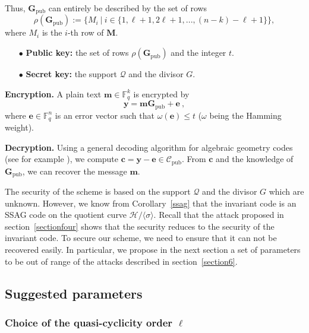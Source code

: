 \documentclass[10pt]{article}
\theoremstyle{definition}
\theoremstyle{definition}
\theoremstyle{definition}
\newcommand{\fq}{\mathbb{F}_q}
\newcommand{\w}{\omega}
\newcommand{\QR}{\mathcal{Q}}
\begin{document}
\noindent Thus, $\mathbf{G}_{\mathrm{pub}}$ can entirely be described by the set of rows
\[\rho(\mathbf{G}_{\mathrm{pub}}) := \{M_i \ | \ i \in \{1,\ell+1,2\ell+1,...,(n-k)-\ell+1\}\},\]
where $M_i$ is the $i$-th row of $\mathbf{M}$. 

\begin{enumerate}
\item[$\bullet$] \textbf{Public key:} the set of rows $\rho(\mathbf{G}_{\mathrm{pub}})$ and the integer $t$.
\item[$\bullet$] \textbf{Secret key:} the support $\QR$ and the divisor $G$.
\end{enumerate}

\noindent \textbf{Encryption.} A plain text $\mathbf{m} \in \fq^k$ is encrypted by 
\[ \mathbf{y}  = \mathbf{m}\mathbf{G}_{\mathrm{pub}} + \mathbf{e} \ ,\]
where $\mathbf{e} \in \fq^n$ is an error vector such that $\w(\mathbf{e}) \leq t$ ($\w$ being the Hamming weight). 

\vspace*{0.2cm}

\noindent \textbf{Decryption.} Using a general decoding algorithm for algebraic geometry codes (see for example \cite{THRP}), we compute $\mathbf{c} = \mathbf{y} - \mathbf{e} \in \mathcal{C}_{\mathrm{pub}}$. From $\mathbf{c}$ and the knowledge of $\mathbf{G}_{\mathrm{pub}}$, we can recover the message $\mathbf{m}$. 

\vspace*{0.2cm}

The security of the scheme is based on the support $\QR$ and the divisor $G$ which are unknown. However, we know from Corollary~\ref{ssag} that the invariant code is an SSAG code on the quotient curve $\mathcal{H}/\langle \sigma \rangle$. Recall that the attack proposed in section~\ref{sectionfour} shows that the security reduces to the security of the invariant code. To secure our scheme, we need to ensure that it can not be recovered easily. In particular, we propose in the next section a set of parameters to be out of range of the attacks described in section~\ref{section6}.


\subsection{Suggested parameters}


\subsubsection{Choice of the quasi-cyclicity order $\ell$} \label{choice of l}
\end{document}
